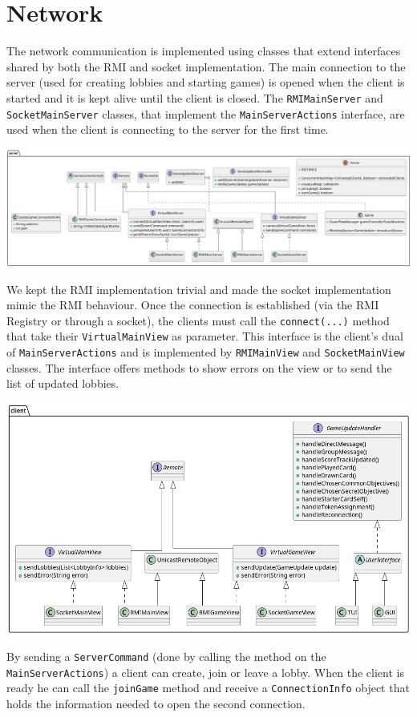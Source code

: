 \documentclass{article}
\begin{document}
\section{Network}
The network communication is implemented using classes that extend interfaces shared by both the RMI and socket implementation.
The main connection to the server (used for creating lobbies and starting games) is opened when the client is started and it
is kept alive until the client is closed.
The \texttt{RMIMainServer} and \texttt{SocketMainServer} classes, that implement the \texttt{MainServerActions} interface,
are used when the client is connecting to the server for the first time.
\begin{center}
    \includegraphics[scale=0.25]{pngs/server1}
\end{center}
We kept the RMI implementation trivial and made the socket implementation mimic the RMI behaviour.
Once the connection is established (via the RMI Registry or through a socket), the clients must call the \texttt{connect(...)} method
that take their \texttt{VirtualMainView} as parameter.
This interface is the client's dual of \texttt{MainServerActions} and is implemented by \texttt{RMIMainView} and \texttt{SocketMainView} classes.
The interface offers methods to show errors on the view or to send the list of updated lobbies.
\begin{center}
    \includegraphics[scale=0.3]{pngs/client}
\end{center}
By sending a \texttt{ServerCommand} (done by calling the method on the \texttt{MainServerActions}) a client can create, join or leave a lobby.
When the client is ready he can call the \texttt{joinGame} method and receive a \texttt{ConnectionInfo} object that holds
the information needed to open the second connection.
\end{document}
